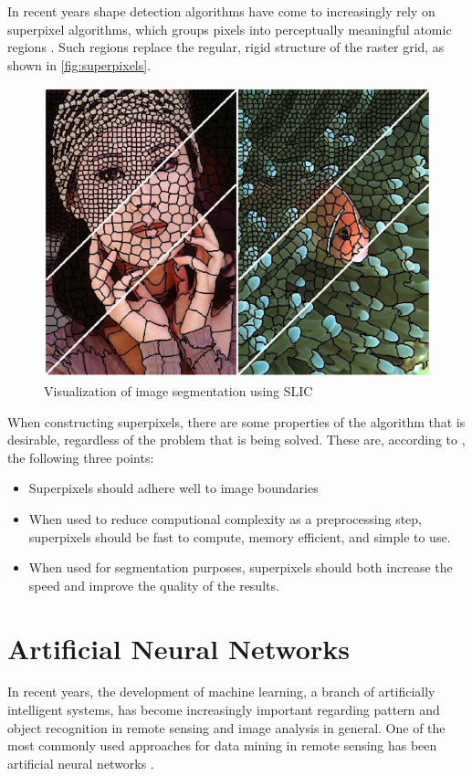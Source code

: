 In recent years shape detection algorithms have come to increasingly rely on superpixel algorithms, which groups pixels into perceptually meaningful atomic regions \citep{Achanta2012}. Such regions replace the regular, rigid structure of the raster grid, as shown in \autoref{fig:superpixels}.

\begin{figure}[!h]
	\centering
	\includegraphics[scale=0.3]{fig/superpixels}
	\caption{Visualization of image segmentation using SLIC \citep{Achanta2012}}
	\label{fig:superpixels}
\end{figure}

When constructing superpixels, there are some properties of the algorithm that is desirable, regardless of the problem that is being solved. These are, according to \citep{Achanta2012}, the following three points:

\begin{itemize}
	\item Superpixels should adhere well to image boundaries
	\item When used to reduce computional complexity as a preprocessing step, superpixels should be fast to compute, memory efficient, and simple to use.
	\item When used for segmentation purposes, superpixels should both increase the speed and improve the quality of the results.
\end{itemize}

\section{Artificial Neural Networks}
In recent years, the development of machine learning, a branch of artificially intelligent systems, has become increasingly important regarding pattern and object recognition in remote sensing and image analysis in general. One of the most commonly used approaches for data mining in remote sensing has been artificial neural networks \cite{Lary2016}.

